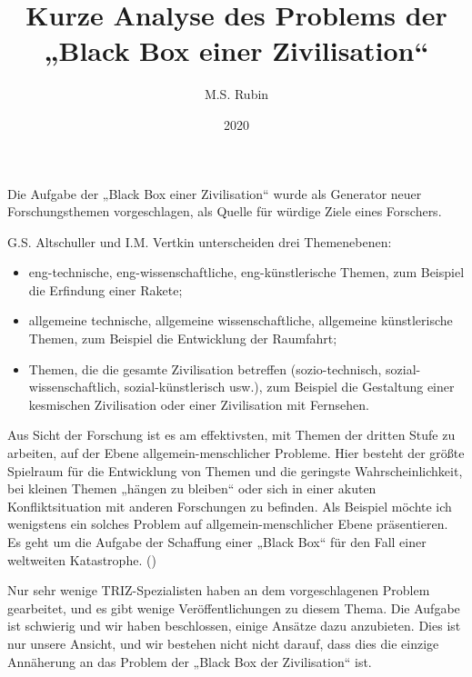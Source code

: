 \documentclass[11pt,a4paper]{article}
\title{Kurze Analyse des Problems der „Black Box einer Zivilisation“}
\author{M.S. Rubin}
\date{2020}
\begin{document}
\maketitle

Die Aufgabe der „Black Box einer Zivilisation“ wurde als Generator neuer
Forschungsthemen vorgeschlagen, als Quelle für würdige Ziele eines Forschers.

G.S. Altschuller und I.M. Vertkin \cite{Altshuller1991} unterscheiden drei
Themenebenen:
\begin{itemize}[noitemsep]
\item eng-technische, eng-wissenschaftliche, eng-künstlerische Themen, zum
  Beispiel die Erfindung einer Rakete;
\item allgemeine technische, allgemeine wissenschaftliche, allgemeine
  künstlerische Themen, zum Beispiel die Entwicklung der Raumfahrt; 
\item Themen, die die gesamte Zivilisation betreffen (sozio-technisch,
  sozial-wissenschaftlich, sozial-künstlerisch usw.), zum Beispiel die
  Gestaltung einer kesmischen Zivilisation oder einer Zivilisation mit
  Fernsehen.
\end{itemize}

Aus Sicht der Forschung ist es am effektivsten, mit Themen der dritten Stufe
zu arbeiten, auf der Ebene allgemein-menschlicher Probleme. Hier besteht der
größte Spielraum für die Entwicklung von Themen und die geringste
Wahrscheinlichkeit, bei kleinen Themen „hängen zu bleiben“ oder sich in einer
akuten Konfliktsituation mit anderen Forschungen zu befinden. Als Beispiel
möchte ich wenigstens ein solches Problem auf allgemein-menschlicher Ebene
präsentieren. Es geht um die Aufgabe der Schaffung einer „Black Box“ für den
Fall einer weltweiten Katastrophe. (\cite[S. 166-168]{Altshuller1991})

Nur sehr wenige TRIZ-Spezialisten haben an dem vorgeschlagenen Problem
gearbeitet, und es gibt wenige Veröffentlichungen zu diesem Thema. Die Aufgabe
ist schwierig und wir haben beschlossen, einige Ansätze dazu anzubieten. Dies
ist nur unsere Ansicht, und wir bestehen nicht nicht darauf, dass dies die
einzige Annäherung an das Problem der „Black Box der Zivilisation“ ist.
\end{document}
